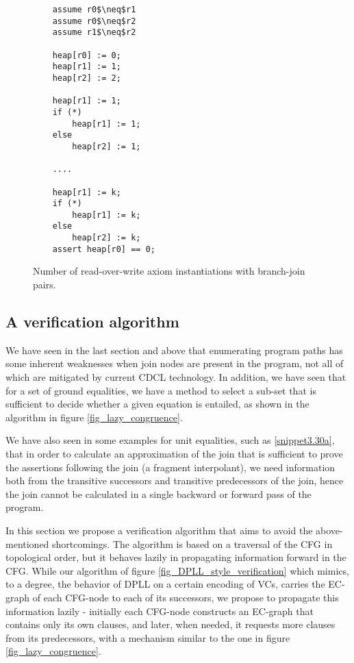 \begin{figure}
\begin{lstlisting}
	assume r0$\neq$r1
	assume r0$\neq$r2
	assume r1$\neq$r2
	
	heap[r0] := 0;
	heap[r1] := 1;
	heap[r2] := 2;
	
	heap[r1] := 1;
	if (*)
		heap[r1] := 1;
	else
		heap[r2] := 1;
	
	....
	
	heap[r1] := k;
	if (*)
		heap[r1] := k;
	else
		heap[r2] := k;
	assert heap[r0] == 0;

\end{lstlisting}
\caption{Number of read-over-write axiom instantiations with branch-join pairs.}
\label{fig_diamond_ROW}
\end{figure}


\subsection{A verification algorithm}
We have seen in the last section and above that enumerating program paths has some inherent weaknesses when join nodes are present in the program, not all of which are mitigated by current CDCL technology.
In addition, we have seen that for a set of ground equalities, we have a method to select a sub-set that is sufficient to decide whether a given equation is entailed, as shown in the algorithm in figure \ref{fig_lazy_congruence}.

We have also seen in some examples for unit equalities, such as \ref{snippet3.30a}, that in order to calculate an approximation of the join that is sufficient to prove the assertions following the join (a fragment interpolant), we need information both from the transitive successors and transitive predecessors of the join, hence the join cannot be calculated in a single backward or forward pass of the program.

In this section we propose a verification algorithm that aims to avoid the above-mentioned shortcomings.
The algorithm is based on a traversal of the CFG in topological order, but it behaves lazily in propagating information forward in the CFG.
While our algorithm of figure \ref{fig_DPLL_style_verification} which mimics, to a degree, the behavior of DPLL on a certain encoding of VCs, carries the EC-graph of each CFG-node to each of its successors, we propose to propagate this information lazily - initially each CFG-node constructs an EC-graph that contains only its own clauses, and later, when needed, it requests more clauses from its predecessors, with a mechanism similar to the one in figure \ref{fig_lazy_congruence}.

